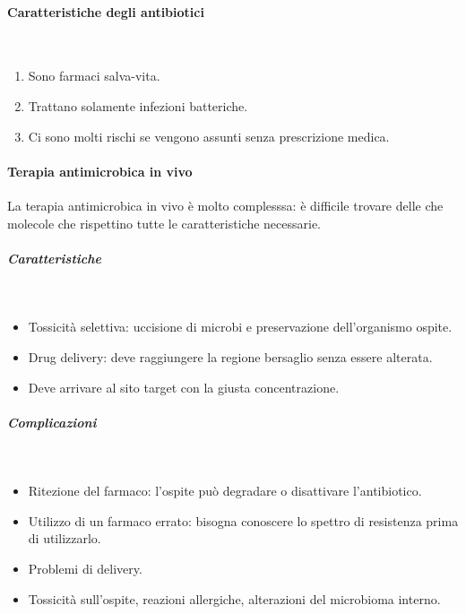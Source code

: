 			\paragraph{Caratteristiche degli antibiotici}\mbox{}\\
			\begin{multicols}{2}
				\begin{enumerate}
    					\item Sono farmaci salva-vita.
    					\item Trattano solamente infezioni batteriche. 
    					\item Ci sono molti rischi se vengono assunti senza prescrizione medica.
				\end{enumerate}
			\end{multicols}

			\paragraph{Terapia antimicrobica in vivo}
			La terapia antimicrobica in vivo è molto complesssa: è difficile trovare delle che molecole che rispettino tutte le caratteristiche necessarie. 
				
				\subparagraph{Caratteristiche}\mbox{}\\
				\begin{multicols}{2}
					\begin{itemize}
						\item Tossicit\`a selettiva: uccisione di microbi e preservazione dell'organismo ospite.
						\item Drug delivery: deve raggiungere la regione bersaglio senza essere alterata.
						\item Deve arrivare al sito target con la giusta concentrazione.
					\end{itemize}
				\end{multicols}

				\subparagraph{Complicazioni}\mbox{}\\
				\begin{multicols}{2}
					\begin{itemize}
    						\item Ritezione del farmaco: l'ospite può degradare o disattivare l'antibiotico. 
    						\item Utilizzo di un farmaco errato: bisogna conoscere lo spettro di resistenza prima di utilizzarlo. 
    						\item Problemi di delivery. 
    						\item Tossicità sull'ospite, reazioni allergiche, alterazioni del microbioma interno.
					\end{itemize}
				\end{multicols}

